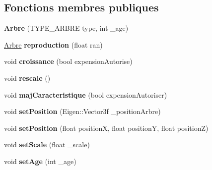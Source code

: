 \subsection*{Fonctions membres publiques}
\begin{DoxyCompactItemize}
\item 
\hypertarget{class_arbre_ad1fc7dea7649955773f521c2f1601c36}{}{\bfseries Arbre} (T\+Y\+P\+E\+\_\+\+A\+R\+B\+R\+E type, int \+\_\+age)\label{class_arbre_ad1fc7dea7649955773f521c2f1601c36}

\item 
\hypertarget{class_arbre_a20fa4e50503c37fa0ab8caebcbf50bff}{}\hyperlink{class_arbre}{Arbre} {\bfseries reproduction} (float ran)\label{class_arbre_a20fa4e50503c37fa0ab8caebcbf50bff}

\item 
\hypertarget{class_arbre_a495509774d40f8207829c3fd815e9689}{}void {\bfseries croissance} (bool expension\+Autorise)\label{class_arbre_a495509774d40f8207829c3fd815e9689}

\item 
\hypertarget{class_arbre_a64dcb3084a97866a54d2fd3e0c82a772}{}void {\bfseries rescale} ()\label{class_arbre_a64dcb3084a97866a54d2fd3e0c82a772}

\item 
\hypertarget{class_arbre_a2b25c927d660e6fdfcd4cea08676e57f}{}void {\bfseries maj\+Caracteristique} (bool expension\+Autoriser)\label{class_arbre_a2b25c927d660e6fdfcd4cea08676e57f}

\item 
\hypertarget{class_arbre_a61711b668e4e2920c45e0f55df197e54}{}void {\bfseries set\+Position} (Eigen\+::\+Vector3f \+\_\+position\+Arbre)\label{class_arbre_a61711b668e4e2920c45e0f55df197e54}

\item 
\hypertarget{class_arbre_a7861210998865c9c1b2e752de24eb787}{}void {\bfseries set\+Position} (float position\+X, float position\+Y, float position\+Z)\label{class_arbre_a7861210998865c9c1b2e752de24eb787}

\item 
\hypertarget{class_arbre_a882dbe4d9dc4f60a7ea8a995a3d0ab2e}{}void {\bfseries set\+Scale} (float \+\_\+scale)\label{class_arbre_a882dbe4d9dc4f60a7ea8a995a3d0ab2e}

\item 
\hypertarget{class_arbre_a0770450144d95ee3c4b2e66dadf2554a}{}void {\bfseries set\+Age} (int \+\_\+age)\label{class_arbre_a0770450144d95ee3c4b2e66dadf2554a}


\end{DoxyCompactItemize}
